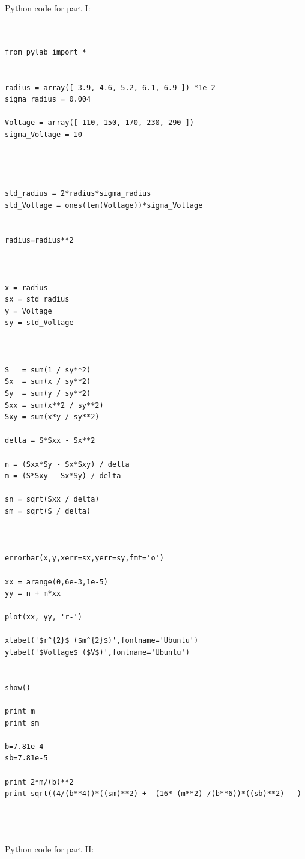 \documentclass[aps,nofootinbib,onecolumn,groupedaddress,a4paper]{revtex4}
\begin{document}
Python code for part I:
\begin{lstlisting}


from pylab import *


radius = array([ 3.9, 4.6, 5.2, 6.1, 6.9 ]) *1e-2		
sigma_radius = 0.004                                            

Voltage = array([ 110, 150, 170, 230, 290 ]) 			
sigma_Voltage = 10                                              




std_radius = 2*radius*sigma_radius
std_Voltage = ones(len(Voltage))*sigma_Voltage


radius=radius**2



x = radius
sx = std_radius
y = Voltage
sy = std_Voltage



S   = sum(1 / sy**2)
Sx  = sum(x / sy**2)
Sy  = sum(y / sy**2)
Sxx = sum(x**2 / sy**2)
Sxy = sum(x*y / sy**2)

delta = S*Sxx - Sx**2

n = (Sxx*Sy - Sx*Sxy) / delta
m = (S*Sxy - Sx*Sy) / delta

sn = sqrt(Sxx / delta)
sm = sqrt(S / delta)



errorbar(x,y,xerr=sx,yerr=sy,fmt='o')

xx = arange(0,6e-3,1e-5)
yy = n + m*xx

plot(xx, yy, 'r-')

xlabel('$r^{2}$ ($m^{2}$)',fontname='Ubuntu')
ylabel('$Voltage$ ($V$)',fontname='Ubuntu')


show()

print m
print sm

b=7.81e-4
sb=7.81e-5

print 2*m/(b)**2
print sqrt((4/(b**4))*((sm)**2) +  (16* (m**2) /(b**6))*((sb)**2)   )




\end{lstlisting}

Python code for part II:
\end{document}
